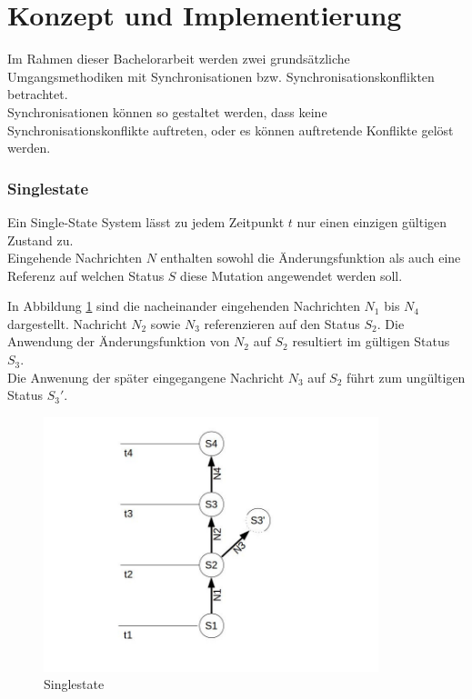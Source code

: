 \documentclass[oneside,11pt,parskip=half,ngerman]{scrreprt}
\makeatletter
\def\maxwidth{\ifdim\Gin@nat@width>\linewidth\linewidth
\else\Gin@nat@width\fi}
\let\Oldincludegraphics\includegraphics
\renewcommand{\includegraphics}[1]{\Oldincludegraphics[width=\maxwidth,height=20em,keepaspectratio]{#1}}
\makeatother
\begin{document}
\part[Teil iii]{Konzept und Implementierung}


Im Rahmen dieser Bachelorarbeit werden zwei grundsätzliche
Umgangsmethodiken mit Synchronisationen bzw. Synchronisationskonflikten
betrachtet.\\Synchronisationen können so gestaltet werden, dass keine
Synchronisationskonflikte auftreten, oder es können auftretende
Konflikte gelöst werden.\\

\newpage

\section{Singlestate}\label{singlestate}

Ein Single-State System lässt zu jedem Zeitpunkt \(t\) nur einen
einzigen gültigen Zustand zu.\\Eingehende Nachrichten \(N\) enthalten
sowohl die Änderungsfunktion als auch eine Referenz auf welchen Status
\(S\) diese Mutation angewendet werden soll.

In Abbildung \ref{fig:singlestate} sind die nacheinander eingehenden
Nachrichten \(N_1\) bis \(N_4\) dargestellt. Nachricht \(N_2\) sowie
\(N_3\) referenzieren auf den Status \(S_2\). Die Anwendung der
Änderungsfunktion von \(N_2\) auf \(S_2\) resultiert im gültigen Status
\(S_3\).\\Die Anwenung der später eingegangene Nachricht \(N_3\) auf
\(S_2\) führt zum ungültigen Status \(S_3'\).

\begin{figure}[htbp]
\centering
\includegraphics{img/singlestate.jpg}
\caption{Singlestate\label{fig:singlestate}}
\end{figure}
\end{document}
